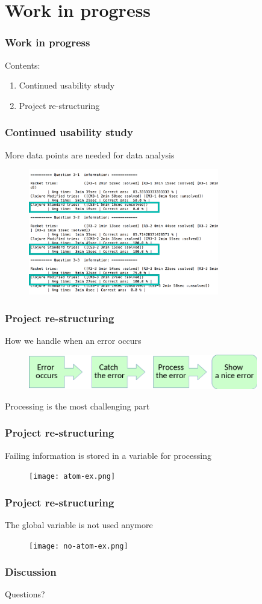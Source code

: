 \documentclass{beamer}
\begin{document}
\section{Work in progress}

\begin{frame}
  \frametitle{Work in progress}
Contents:
\begin{enumerate}
\item Continued usability study 
\item Project re-structuring
\end{enumerate}
\end{frame}

\begin{frame}
  \frametitle{Continued usability study }
More data points are needed for data analysis
\begin{figure}
\includegraphics[height=55mm]{one-data.png}
\end{figure}
\end{frame}


\begin{frame}
  \frametitle{Project re-structuring}
How we handle when an error occurs 
\begin{figure}
\includegraphics[height=15mm]{Step.png}
\end{figure}
\alert{Processing} is the most challenging part
\end{frame}


\begin{frame}
  \frametitle{Project re-structuring}
Failing information is stored in a variable for processing
\begin{figure}
\texttt{[image: atom-ex.png]}
\end{figure}
\end{frame}

\begin{frame}
  \frametitle{Project re-structuring}
The global variable is not used anymore
\begin{figure}
\texttt{[image: no-atom-ex.png]}
\end{figure}
\end{frame}

\begin{frame}
  \frametitle{Discussion}
Questions?
\end{frame}
\end{document}
